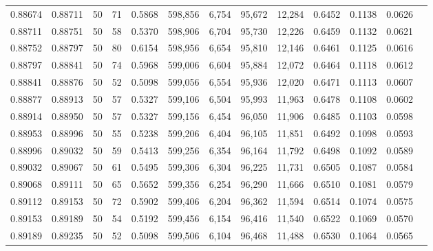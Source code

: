 \begin{tabular}{rrrrrrrrrrrrr}
0.88674 & 0.88711 &    50 &  71 &                                     0.5868 & 598,856 &   6,754 &  95,672 &  12,284 & 0.6452 & 0.1138 & 0.0626 \\
0.88711 & 0.88751 &    50 &  58 &                                     0.5370 & 598,906 &   6,704 &  95,730 &  12,226 & 0.6459 & 0.1132 & 0.0621 \\
0.88752 & 0.88797 &    50 &  80 &                                     0.6154 & 598,956 &   6,654 &  95,810 &  12,146 & 0.6461 & 0.1125 & 0.0616 \\
0.88797 & 0.88841 &    50 &  74 &                                     0.5968 & 599,006 &   6,604 &  95,884 &  12,072 & 0.6464 & 0.1118 & 0.0612 \\
0.88841 & 0.88876 &    50 &  52 &                                     0.5098 & 599,056 &   6,554 &  95,936 &  12,020 & 0.6471 & 0.1113 & 0.0607 \\
0.88877 & 0.88913 &    50 &  57 &                                     0.5327 & 599,106 &   6,504 &  95,993 &  11,963 & 0.6478 & 0.1108 & 0.0602 \\
0.88914 & 0.88950 &    50 &  57 &                                     0.5327 & 599,156 &   6,454 &  96,050 &  11,906 & 0.6485 & 0.1103 & 0.0598 \\
0.88953 & 0.88996 &    50 &  55 &                                     0.5238 & 599,206 &   6,404 &  96,105 &  11,851 & 0.6492 & 0.1098 & 0.0593 \\
0.88996 & 0.89032 &    50 &  59 &                                     0.5413 & 599,256 &   6,354 &  96,164 &  11,792 & 0.6498 & 0.1092 & 0.0589 \\
0.89032 & 0.89067 &    50 &  61 &                                     0.5495 & 599,306 &   6,304 &  96,225 &  11,731 & 0.6505 & 0.1087 & 0.0584 \\
0.89068 & 0.89111 &    50 &  65 &                                     0.5652 & 599,356 &   6,254 &  96,290 &  11,666 & 0.6510 & 0.1081 & 0.0579 \\
0.89112 & 0.89153 &    50 &  72 &                                     0.5902 & 599,406 &   6,204 &  96,362 &  11,594 & 0.6514 & 0.1074 & 0.0575 \\
0.89153 & 0.89189 &    50 &  54 &                                     0.5192 & 599,456 &   6,154 &  96,416 &  11,540 & 0.6522 & 0.1069 & 0.0570 \\
0.89189 & 0.89235 &    50 &  52 &                                     0.5098 & 599,506 &   6,104 &  96,468 &  11,488 & 0.6530 & 0.1064 & 0.0565 \\

\end{tabular}

